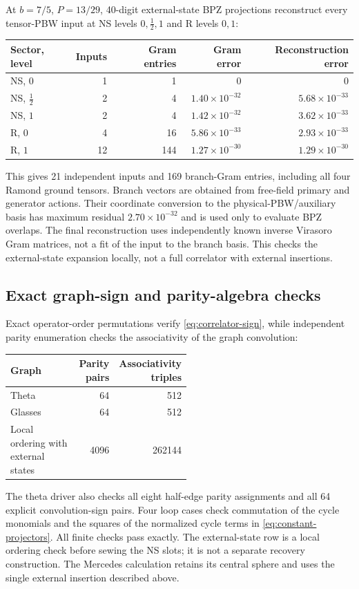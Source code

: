 \documentclass[11pt]{article}
\numberwithin{equation}{section}
\begin{document}
At $b=7/5$, $P=13/29$, 40-digit external-state BPZ projections reconstruct
every tensor-PBW input at NS levels $0,\frac12,1$ and R levels $0,1$:
\begin{center}
\small
\begin{tabular}{@{}lrrrr@{}}
\toprule
Sector, level & Inputs & Gram entries & Gram error & Reconstruction error\\
\midrule
NS, $0$ & 1 & 1 & $0$ & $0$\\
NS, $\frac12$ & 2 & 4 & $1.40\times10^{-32}$ & $5.68\times10^{-33}$\\
NS, $1$ & 2 & 4 & $1.42\times10^{-32}$ & $3.62\times10^{-33}$\\
R, $0$ & 4 & 16 & $5.86\times10^{-33}$ & $2.93\times10^{-33}$\\
R, $1$ & 12 & 144 & $1.27\times10^{-30}$ & $1.29\times10^{-30}$\\
\bottomrule
\end{tabular}
\end{center}
This gives 21 independent inputs and 169 branch-Gram entries, including
all four Ramond ground tensors. Branch vectors are obtained from
free-field primary and generator actions. Their coordinate conversion to
the physical-PBW/auxiliary basis has maximum residual
$2.70\times10^{-32}$ and is used only to evaluate BPZ overlaps.
The final reconstruction uses independently known inverse Virasoro Gram
matrices, not a fit of the input to the branch basis. This checks the
external-state expansion locally, not a full correlator with external
insertions.

\subsection{Exact graph-sign and parity-algebra checks}

Exact operator-order permutations verify \eqref{eq:correlator-sign}, while
independent parity enumeration checks the associativity of the graph
convolution:
\begin{center}
\small
\begin{tabular}{@{}p{0.52\linewidth}rr@{}}
\toprule
Graph & Parity pairs & Associativity triples\\
\midrule
Theta & 64 & 512\\
Glasses & 64 & 512\\
Local ordering with external states & 4096 & 262144\\
\bottomrule
\end{tabular}
\end{center}
The theta driver also checks all eight half-edge parity assignments and
all 64 explicit convolution-sign pairs. Four loop cases check commutation of the cycle monomials
and the squares of the normalized cycle terms in \eqref{eq:constant-projectors}. All finite checks pass exactly. The external-state row is a local
ordering check before sewing the NS slots; it is not a separate recovery
construction. The Mercedes calculation retains its central sphere and
uses the single external insertion described above.
\end{document}
